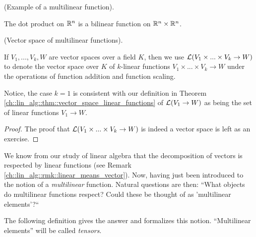 \begin{example}
    (Example of a multilinear function). 
    
    The dot product on $\mathbb{R}^n$ is a bilinear function on $\mathbb{R}^n \times \mathbb{R}^n$.
\end{example}

\begin{defn}
    (Vector space of multilinear functions).
    
    If $V_1, ..., V_k, W$ are vector spaces over a field $K$, then we use $\mathcal{L}(V_1 \times ... \times V_k \rightarrow W)$ to denote the vector space over $K$ of $k$-linear functions $V_1 \times ... \times V_k \rightarrow W$ under the operations of function addition and function scaling.
    
    Notice, the case $k = 1$ is consistent with our definition in Theorem \ref{ch::lin_alg::thm::vector_space_linear_functions} of $\mathcal{L}(V_1 \rightarrow W)$ as being the set of linear functions $V_1 \rightarrow W$.
\end{defn}

\begin{proof}
     The proof that $\mathcal{L}(V_1 \times ... \times V_k \rightarrow W)$ is indeed a vector space is left as an exercise.
\end{proof}

We know from our study of linear algebra that the decomposition of vectors is respected by linear functions (see Remark \ref{ch::lin_alg::rmk::linear_means_vector}). Now, having just been introduced to the notion of a \textit{multilinear} function. Natural questions are then: ``What objects do multilinear functions respect? Could these be thought of as 'multilinear elements'?`` 

The following definition gives the answer and formalizes this notion. ``Multilinear elements'' will be called \textit{tensors}.

\newpage

